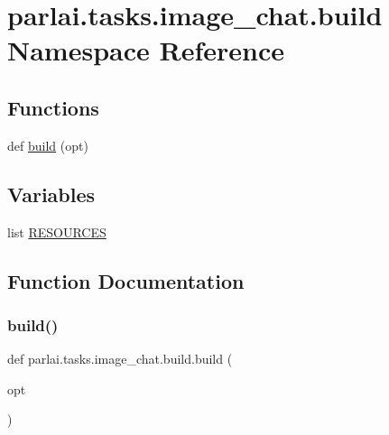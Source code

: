 \hypertarget{namespaceparlai_1_1tasks_1_1image__chat_1_1build}{}\section{parlai.\+tasks.\+image\+\_\+chat.\+build Namespace Reference}
\label{namespaceparlai_1_1tasks_1_1image__chat_1_1build}
\subsection*{Functions}
\begin{DoxyCompactItemize}
\item 
def \hyperlink{namespaceparlai_1_1tasks_1_1image__chat_1_1build_a82355284c67a174d8c8a730a4a819906}{build} (opt)
\end{DoxyCompactItemize}
\subsection*{Variables}
\begin{DoxyCompactItemize}
\item 
list \hyperlink{namespaceparlai_1_1tasks_1_1image__chat_1_1build_a16b6341acb1502cb3bd80737372fd208}{R\+E\+S\+O\+U\+R\+C\+ES}
\end{DoxyCompactItemize}


\subsection{Function Documentation}
\mbox{\label{namespaceparlai_1_1tasks_1_1image__chat_1_1build_a82355284c67a174d8c8a730a4a819906}} 
\subsubsection{\texorpdfstring{build()}{build()}}
{\footnotesize\ttfamily def parlai.\+tasks.\+image\+\_\+chat.\+build.\+build (\begin{DoxyParamCaption}\item[{}]{opt }\end{DoxyParamCaption})}



